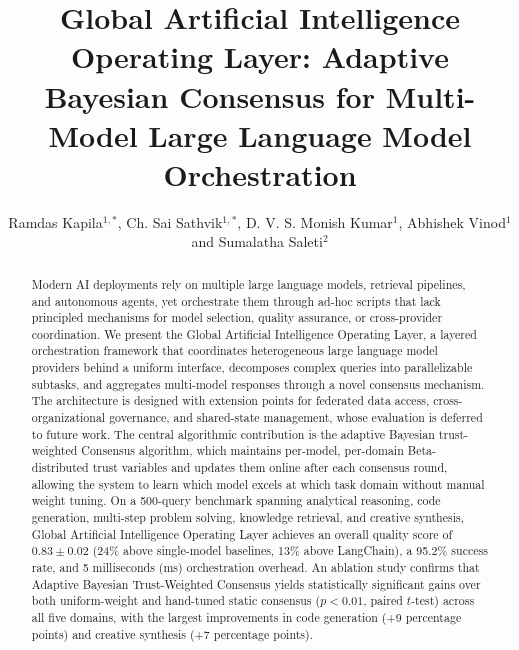 \documentclass{iopjournal}
\begin{document}
{\raggedright{}\par}
\title{Global Artificial Intelligence Operating Layer: Adaptive Bayesian Consensus for Multi-Model Large Language Model Orchestration}

\author{Ramdas Kapila$^{1,*}$, Ch. Sai Sathvik$^{1,*}$, D. V. S. Monish Kumar$^1$, Abhishek Vinod$^1$ and Sumalatha Saleti$^2$}






\begin{abstract}
Modern AI deployments rely on multiple large language models, retrieval pipelines, and autonomous agents, yet orchestrate them through ad-hoc scripts that lack principled mechanisms for model selection, quality assurance, or cross-provider coordination. We present the Global Artificial Intelligence Operating Layer, a layered orchestration framework that coordinates heterogeneous large language model providers behind a uniform interface, decomposes complex queries into parallelizable subtasks, and aggregates multi-model responses through a novel consensus mechanism. The architecture is designed with extension points for federated data access, cross-organizational governance, and shared-state management, whose evaluation is deferred to future work. The central algorithmic contribution is the adaptive Bayesian trust-weighted Consensus algorithm, which maintains per-model, per-domain Beta-distributed trust variables and updates them online after each consensus round, allowing the system to learn which model excels at which task domain without manual weight tuning. On a 500-query benchmark spanning analytical reasoning, code generation, multi-step problem solving, knowledge retrieval, and creative synthesis, Global Artificial Intelligence Operating Layer achieves an overall quality score of $0.83 \pm 0.02$ (24\% above single-model baselines, 13\% above LangChain), a 95.2\% success rate, and 5 milliseconds (ms) orchestration overhead. An ablation study confirms that Adaptive Bayesian Trust-Weighted Consensus yields statistically significant gains over both uniform-weight and hand-tuned static consensus ($p < 0.01$, paired $t$-test) across all five domains, with the largest improvements in code generation (+9 percentage points) and creative synthesis (+7 percentage points).
\end{abstract}
\end{document}

